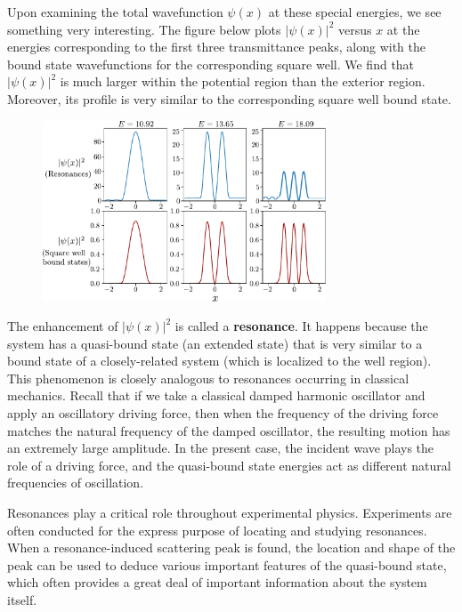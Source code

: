 \documentclass[pra,12pt]{revtex4}
\begin{document}
Upon examining the total wavefunction $\psi(x)$ at these special
energies, we see something very interesting.  The figure below plots
$|\psi(x)|^2$ versus $x$ at the energies corresponding to the first
three transmittance peaks, along with the bound state wavefunctions
for the corresponding square well.  We find that $|\psi(x)|^2$ is much
larger within the potential region than the exterior region.
Moreover, its profile is very similar to the corresponding square well
bound state.

\begin{figure}[h]
  \centering\includegraphics[width=0.75\textwidth]{resonancewavefunctions}
\end{figure}

The enhancement of $|\psi(x)|^2$ is called a \textbf{resonance}.  It
happens because the system has a quasi-bound state (an extended state)
that is very similar to a bound state of a closely-related system
(which is localized to the well region).  This phenomenon is closely
analogous to resonances occurring in classical mechanics.  Recall that
if we take a classical damped harmonic oscillator and apply an
oscillatory driving force, then when the frequency of the driving
force matches the natural frequency of the damped oscillator, the
resulting motion has an extremely large amplitude.  In the present
case, the incident wave plays the role of a driving force, and the
quasi-bound state energies act as different natural frequencies of
oscillation.

Resonances play a critical role throughout experimental physics.
Experiments are often conducted for the express purpose of locating
and studying resonances.  When a resonance-induced scattering peak is
found, the location and shape of the peak can be used to deduce
various important features of the quasi-bound state, which often
provides a great deal of important information about the system
itself.
\end{document}
